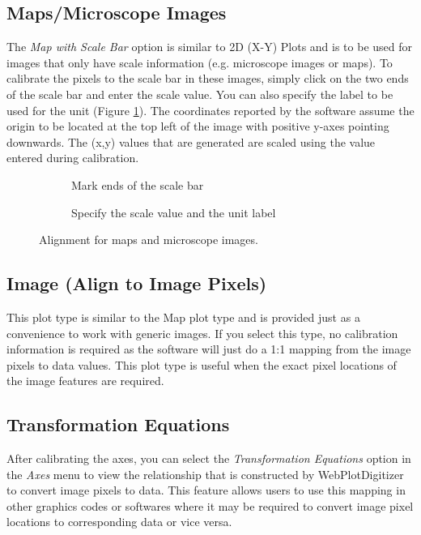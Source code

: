 \documentclass[letterpaper, 11pt]{article}
\begin{document}
\subsection{Maps/Microscope Images}
The \emph{Map with Scale Bar} option is similar to 2D (X-Y) Plots and is to be used for images that only have scale information (e.g. microscope images or maps). To calibrate the pixels to the scale bar in these images, simply click on the two ends of the scale bar and enter the scale value. You can also specify the label to be used for the unit (Figure \ref{fig:mapAlignment}). The coordinates reported by the software assume the origin to be located at the top left of the image with positive y-axes pointing downwards. The (x,y) values that are generated are scaled using the value entered during calibration.

\begin{figure}
\centering
{\begin{subfigure}[b]{0.4\textwidth}
\caption{Mark ends of the scale bar}
\end{subfigure}
\hspace{5mm}
\begin{subfigure}[b]{0.3\textwidth}
\caption{Specify the scale value and the unit label}
\end{subfigure}}
\caption{Alignment for maps and microscope images.}
\label{fig:mapAlignment}
\end{figure}

\subsection{Image (Align to Image Pixels)}
This plot type is similar to the Map plot type and is provided just as a convenience to work with generic images. If you select this type, no calibration information is required as the software will just do a 1:1 mapping from the image pixels to data values. This plot type is useful when the exact pixel locations of the image features are required.

\subsection{Transformation Equations}
After calibrating the axes, you can select the \emph{Transformation Equations} option in the \emph{Axes} menu to view the relationship that is constructed by WebPlotDigitizer to convert image pixels to data. This feature allows users to use this mapping in other graphics codes or softwares where it may be required to convert image pixel locations to corresponding data or vice versa.
\end{document}
